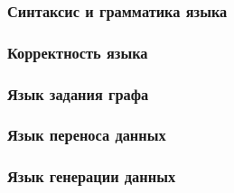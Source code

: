 \subsubsection{Синтаксис и грамматика языка}

\subsubsection{Корректность языка}

\subsubsection{Язык задания графа}

\subsubsection{Язык переноса данных}

\subsubsection{Язык генерации данных}

